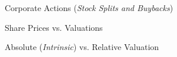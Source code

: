 \documentclass[10pt]{article}
\begin{document}
    \begin{core}{Corporate Actions (\textit{Stock Splits and Buybacks})}



    \end{core}

    \begin{core}{Share Prices vs. Valuations}


    \end{core}

    \begin{core}{Absolute (\textit{Intrinsic}) vs. Relative Valuation}





    \end{core}
\end{document}

